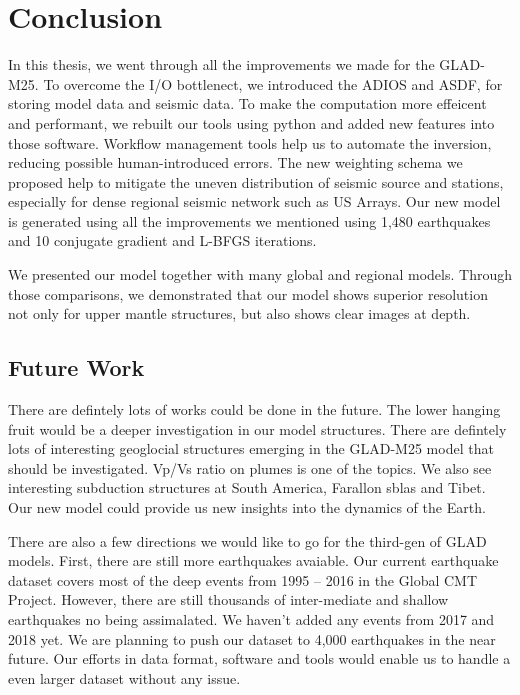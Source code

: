 \newpage
\chapter{Conclusion}
\label{ch:conclusion}

In this thesis, we went through all the improvements we made for the GLAD-M25.
To overcome the I/O bottlenect, we introduced the ADIOS and ASDF, for storing 
model data and seismic data. To make the computation more effeicent and performant,
we rebuilt our tools using python and added new features into those software.
Workflow management tools help us to automate the inversion, reducing possible
human-introduced errors. The new weighting schema we proposed help to
mitigate the uneven distribution of seismic source and stations, especially
for dense regional seismic network such as US Arrays. Our new model is
generated using all the improvements we mentioned using 1,480 earthquakes and
10 conjugate gradient and L-BFGS iterations.

We presented our model together with many global and regional models. Through
those comparisons, we demonstrated that our model shows superior resolution
not only for upper mantle structures, but also shows clear images at depth.

\section{Future Work}

There are defintely lots of works could be done in the future. The lower hanging
fruit would be a deeper investigation in our model structures.
There are defintely lots of interesting geoglocial structures emerging in the
GLAD-M25 model that should be investigated. Vp/Vs ratio on plumes is one of
the topics. We also see interesting subduction structures at South America,
Farallon sblas and Tibet. Our new model could provide us new insights into the
dynamics of the Earth.

There are also a few directions we would like to go for the third-gen of GLAD
models. First, there are still more earthquakes avaiable. Our current earthquake
dataset covers most of the deep events from 1995 -- 2016 in the Global CMT Project. However,
there are still thousands of inter-mediate and shallow earthquakes no being
assimalated. We haven't added any events from 2017 and 2018 yet. We are planning
to push our dataset to 4,000 earthquakes in the near future. Our efforts 
in data format, software and tools would enable us to handle a even larger dataset
without any issue.

